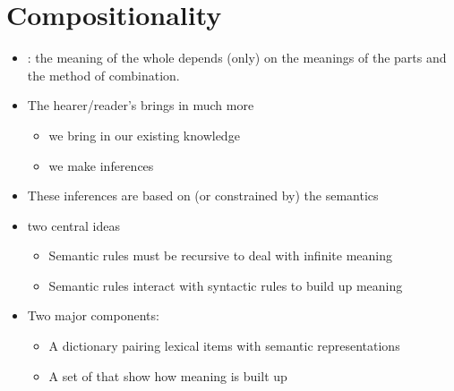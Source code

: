 \documentclass[a4paper,landscape,headrule,footrule,xetex]{foils}
\begin{document}
\section{Compositionality}




\begin{itemize}
\item {}: the meaning of the whole depends (only)
  on the meanings of the parts and the method of combination.
\item The hearer/reader's  brings in much more
  \begin{itemize}
  \item we bring in our existing knowledge
  \item we make inferences
  \end{itemize}
\item These inferences are based on (or constrained by) the semantics 
\item two central ideas \citep[formalized by: ][]{Katz:Fodor:1963}
  \begin{itemize}
  \item Semantic rules must be recursive to deal with infinite meaning
  \item Semantic rules interact with syntactic rules to build up meaning
  \end{itemize}
\item Two major components:
  \begin{itemize}
  \item A dictionary pairing lexical items with semantic representations
  \item A set of  that show how meaning is built up
  \end{itemize}
\end{itemize}

\end{document}
